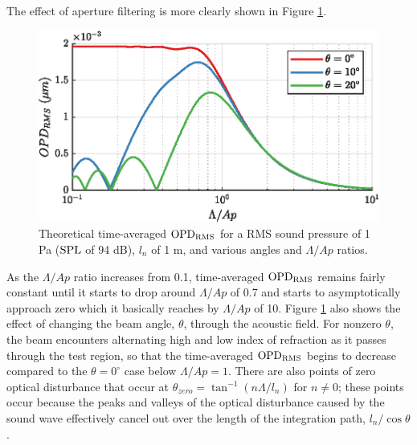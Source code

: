The effect of aperture filtering is more clearly shown in Figure \ref{fig:03_planar_sample_calc_1}.
\begin{figure}
  \centering
  \includegraphics{../matlab/03_aero_optics_acoustics/planar_sample_calc_1.eps}
  \caption{Theoretical time-averaged $\operatorname{OPD_{RMS}}$ for a RMS sound pressure of 1 Pa ($\operatorname{SPL}$ of 94 dB), $l_n$ of 1 m, and various angles and $\Lambda/Ap$ ratios.}
  \label{fig:03_planar_sample_calc_1}
\end{figure}
As the $\Lambda/Ap$ ratio increases from 0.1, time-averaged $\operatorname{OPD_{RMS}}$ remains fairly constant until it starts to drop around $\Lambda/Ap$ of 0.7 and starts to asymptotically approach zero which it basically reaches by $\Lambda/Ap$ of 10.
Figure \ref{fig:03_planar_sample_calc_1} also shows the effect of changing the beam angle, $\theta$, through the acoustic field.
For nonzero $\theta$, the beam encounters alternating high and low index of refraction as it passes through the test region, so that the time-averaged $\operatorname{OPD_{RMS}}$ begins to decrease compared to the $\theta = 0^\circ$ case below $\Lambda/Ap=1$.
There are also points of zero optical disturbance that occur at $\theta_{zero}=\tan^{-1}(n\Lambda/l_n)$ for $n\neq0$; these points occur because the peaks and valleys of the optical disturbance caused by the sound wave effectively cancel out over the length of the integration path, $l_n/\cos\theta$.

